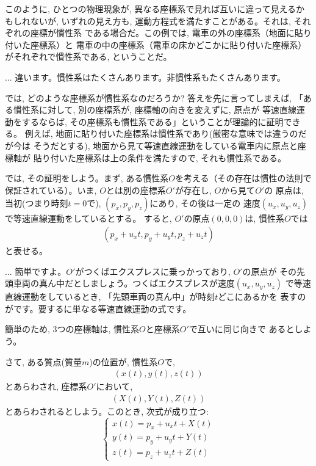 このように, ひとつの物理現象が, 異なる座標系で見れば互いに違って見えるかもしれないが, 
いずれの見え方も, 運動方程式を満たすことがある。それは, それぞれの座標が慣性系
である場合だ。この例では, 電車の外の座標系（地面に貼り付いた座標系）と
電車の中の座標系（電車の床かどこかに貼り付いた座標系）がそれぞれで慣性系である, 
ということだ。

\begin{faq}{\small{}
... 違います。慣性系はたくさんあります。非慣性系もたくさんあります。}\end{faq}

では, どのような座標系が慣性系なのだろうか? 答えを先に言ってしまえば, 
「ある慣性系に対して, 別の座標系が, 座標軸の向きを変えずに, 原点が
等速直線運動をするならば, その座標系も慣性系である」ということが理論的に証明できる。
例えば, 地面に貼り付いた座標系は慣性系であり(厳密な意味では違うのだが今は
そうだとする), 地面から見て等速直線運動をしている電車内に原点と座標軸が
貼り付いた座標系は上の条件を満たすので, それも慣性系である。

では, その証明をしよう。まず, ある慣性系$O$を考える（その存在は慣性の法則で
保証されている）。いま, $O$とは別の座標系$O'$が存在し, $O$から見て$O'$の
原点は, 当初(つまり時刻$t=0$で), $(p_x, p_y, p_z)$にあり, その後は一定の
速度$(u_x, u_y, u_z)$で等速直線運動をしているとする。
すると, $O'$の原点$(0, 0, 0)$は, 慣性系$O$では
\begin{eqnarray}
(p_x+u_xt, p_y+u_yt, p_z+u_zt)\label{eq:origin_move0}
\end{eqnarray}
と表せる。

\begin{faq}{\small{}
... 簡単ですよ。$O'$がつくばエクスプレスに乗っかっており, $O'$の原点が
その先頭車両の真ん中だとしましょう。つくばエクスプレスが速度$(u_x, u_y, u_z)$
で等速直線運動をしているとき, 「先頭車両の真ん中」が時刻$t$どこにあるかを
表すのがです。要するに単なる等速直線運動の式です。
}\end{faq}

簡単のため, 3つの座標軸は, 慣性系$O$と座標系$O'$で互いに同じ向きで
あるとしよう。

さて, ある質点(質量$m$)の位置が, 慣性系$O$で, 
\begin{eqnarray}(x(t), y(t), z(t))\end{eqnarray}
とあらわされ, 座標系$O'$において, 
\begin{eqnarray}(X(t), Y(t), Z(t))\label{eq:coordinate_O'}\end{eqnarray}
とあらわされるとしよう。このとき, 次式が成り立つ:
\begin{equation}\begin{cases}
x(t)=p_x+u_xt+X(t)\\
y(t)=p_y+u_yt+Y(t)\\
z(t)=p_z+u_zt+Z(t)
\end{cases}\label{eq:origin_move2}
\end{equation}

